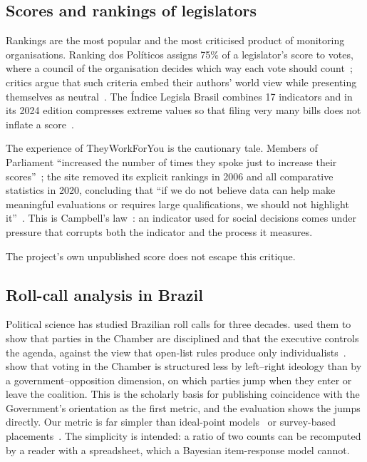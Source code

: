\subsection{Scores and rankings of legislators}

Rankings are the most popular and the most criticised product of monitoring organisations. Ranking dos Pol\'iticos assigns 75\% of a legislator's score to votes, where a council of the organisation decides which way each vote should count~\citep{rankingpoliticos2026criterios}; critics argue that such criteria embed their authors' world view while presenting themselves as neutral~\citep{queiroz2022rankings,filho2018engodo}. The \'Indice Legisla Brasil combines 17 indicators and in its 2024 edition compresses extreme values so that filing very many bills does not inflate a score~\citep{legislabrasil2025relatorio}.

The experience of TheyWorkForYou is the cautionary tale. Members of Parliament ``increased the number of times they spoke just to increase their scores''~\citep{korthagen2020parliamentary}; the site removed its explicit rankings in 2006 and all comparative statistics in 2020, concluding that ``if we do not believe data can help make meaningful evaluations or requires large qualifications, we should not highlight it''~\citep{parsons2020publishing}. This is Campbell's law~\citep{campbell1979assessing}: an indicator used for social decisions comes under pressure that corrupts both the indicator and the process it measures.

The project's own unpublished score does not escape this critique.

\subsection{Roll-call analysis in Brazil}

Political science has studied Brazilian roll calls for three decades. \citet{figueiredo1999executivo} used them to show that parties in the Chamber are disciplined and that the executive controls the agenda, against the view that open-list rules produce only individualists~\citep{ames2001deadlock,mainwaring1999rethinking}. \citet{zucco2011distinguishing} show that voting in the Chamber is structured less by left--right ideology than by a government--opposition dimension, on which parties jump when they enter or leave the coalition. This is the scholarly basis for publishing coincidence with the Government's orientation as the first metric, and the evaluation shows the jumps directly. Our metric is far simpler than ideal-point models~\citep{poole1997congress,clinton2004statistical} or survey-based placements~\citep{power2009estimating}. The simplicity is intended: a ratio of two counts can be recomputed by a reader with a spreadsheet, which a Bayesian item-response model cannot.

